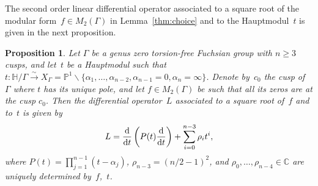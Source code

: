 \documentclass[pdftex]{sigma}
\newcommand{\C}{\mathbb{C}}
\newcommand{\pro}{\mathbb{P}}
\newcommand{\Po}{\mathbb{H}}
\numberwithin{equation}{section}
\newtheorem{Proposition}[Theorem]{Proposition}
 { \theoremstyle{definition}
\newtheorem{Definition}[Theorem]{Definition}
\newtheorem{Example}[Theorem]{Example}
\newtheorem{Remark}[Theorem]{Remark} }
\begin{document}
The second order linear differential operator associated to a square root of the modular form~$f\in M_2(\Gamma)$ in Lemma~\ref{thm:choice} and to the Hauptmodul~$t$ is given in the next proposition.

\begin{Proposition}\label{thm:f} Let $\Gamma$ be a genus zero torsion-free Fuchsian group with $n\ge 3$ cusps, and let~$t$ be a Hauptmodul such that $t\colon\Po/\Gamma\overset{\sim}{\rightarrow}X_\Gamma=\pro^1\smallsetminus\{\alpha_1,\dots,\alpha_{n-2},\alpha_{n-1}=0,\alpha_n=\infty\}$.
Denote by~$c_0$ the cusp of~$\Gamma$ where $t$ has its unique pole, and let $f\in M_2(\Gamma)$ be such that all its zeros are at the cusp $c_0$.
Then the differential operator~$L$ associated to a square root of~$f$ and to~$t$ is given by
\begin{equation}\label{eqn:f}
L = \frac{{\rm d}}{{\rm d}t}\left(P(t)\frac{{\rm d}}{{\rm d}t}\right)+\sum_{i=0}^{n-3}\rho_it^i,
\end{equation}
where $P(t)=\prod_{j=1}^{n-1}{(t-\alpha_j)}$, $\rho_{n-3}=(n/2-1)^2$, and $\rho_0,\dots,\rho_{n-4}\in\C$ are uniquely determined by~$f$,~$t$.
\end{Proposition}
\end{document}
